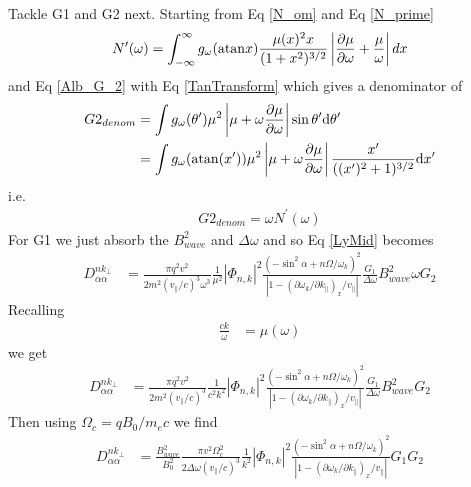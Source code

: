 \documentclass[]{article}
\begin{document}
\noindent Tackle G1 and G2 next. Starting from Eq \ref{N_om} and Eq \ref{N_prime}
\begin{equation}
N^\prime(\omega) =\int_{-\infty}^\infty g_\omega( \mathrm{atan} x ) 
 \frac{\mu(x)^2 x}{(1+x^2)^{3/2}}
 \left| \frac{\partial \mu}{\partial \omega} + \frac {\mu}{\omega}\right|
 d x
\end{equation} and Eq \ref{Alb_G_2} with Eq \ref{TanTransform} which gives a denominator of
\begin{align}
G2_{denom} &= \int g_\omega(\theta^\prime) \mu^2 \left| \mu + \omega \frac{\partial\mu}{\partial\omega}\right| \sin \theta^\prime \mathrm{d} \theta^\prime\\
&=\int g_\omega(\mathrm{atan}(x^\prime)) \mu^2 \left| \mu + \omega \frac{\partial\mu}{\partial\omega}\right|  \frac{x^\prime}{((x^\prime)^2 + 1)^{3/2}}\mathrm{d}x^\prime
\end{align}
i.e.
\begin{align}
G2_{denom} = \omega N^\prime(\omega)
\end{align}
For G1 we just absorb the $B^2_{wave}$ and $\Delta \omega$ and so Eq \ref{LyMid} becomes
\begin{align}
D_{\alpha\alpha}^{nk_\perp} &= \frac{\pi q^2 v^2}{2 m^2 (v_\parallel/c)^3 \omega^3} \frac{1}{\mu^2} |\Phi_{n,k}|^2 \frac{ (-\sin^2\alpha + n \Omega/\omega_k)^2}{ |1-(\partial \omega_k/\partial k_\parallel)_x/v_\parallel|} \frac{G_1}{\Delta \omega} B^2_{wave} \omega G_2
\end{align}
Recalling
\begin{align}
\frac{c k}{\omega} &= \mu(\omega) %
\end{align} we get
\begin{align}\label{LyMid2}
D_{\alpha\alpha}^{nk_\perp} &= \frac{\pi q^2 v^2}{2 m^2 (v_\parallel/c)^3}\frac{1}{c^2 k^2} |\Phi_{n,k}|^2 \frac{ (-\sin^2\alpha + n \Omega/\omega_k)^2}{ |1-(\partial \omega_k/\partial k_\parallel)_x/v_\parallel|} \frac{G_1}{\Delta \omega} B^2_{wave} G_2
\end{align}
Then using $ \Omega_c = q B_0 / m_e c$ we find
\begin{align}\label{LyMid3}
D_{\alpha\alpha}^{nk_\perp} &= \frac{B^2_{wave}}{B_0^2} \frac{\pi v^2 \Omega_c^2}{2 \Delta \omega(v_\parallel/c)^3}\frac{1}{ k^2} |\Phi_{n,k}|^2 \frac{ (-\sin^2\alpha + n \Omega/\omega_k)^2}{ |1-(\partial \omega_k/\partial k_\parallel)_x/v_\parallel|} G_1 G_2
\end{align}
\end{document}
